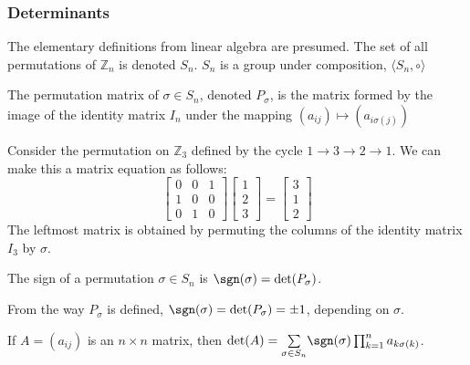 \documentclass[crop=false,class=article,oneside]{standalone}
\begin{document}
        \subsubsection{Determinants}
            The elementary definitions from linear algebra
            are presumed. The set of all permutations of
            $\mathbb{Z}_{n}$ is denoted $S_n$. $S_{n}$ is a
            group under composition,
            $\langle S_{n},\circ\rangle$
            \begin{definition}
                The permutation matrix of $\sigma \in S_{n}$,
                denoted $P_{\sigma}$, is the matrix formed
                by the image of the identity matrix $I_{n}$
                under the mapping
                $(a_{ij})\mapsto (a_{i\sigma(j)})$
            \end{definition}
            \begin{example}
                Consider the permutation on $\mathbb{Z}_3$
                defined by the cycle
                $1\rightarrow 3\rightarrow 2\rightarrow 1$.
                We can make this a matrix equation as follows:
                \begin{equation*}
                    \begin{bmatrix}
                        0&0&1\\
                        1&0&0\\
                        0&1&0
                    \end{bmatrix}
                    \begin{bmatrix}
                        1\\
                        2\\
                        3
                    \end{bmatrix}
                    =
                    \begin{bmatrix}
                        3\\
                        1\\
                        2
                    \end{bmatrix}    
                \end{equation*}
                The leftmost matrix is obtained by
                permuting the columns of the identity
                matrix $I_{3}$ by $\sigma$.
            \end{example}
            \begin{definition}
                The sign of a permutation $\sigma\in S_{n}$
                is $\sgn(\sigma) = \det(P_{\sigma})$.
            \end{definition}
            \begin{remark}
                From the way $P_{\sigma}$ is defined,
                $\sgn(\sigma)=\det(P_{\sigma})=\pm 1$,
                depending on $\sigma$.
            \end{remark}
            \begin{theorem}
                If $A=(a_{ij})$ is an $n\times n$ matrix, then
                $\det(A)=\underset{\sigma\in S_n}%
                 \sum\sgn(\sigma)\prod_{k=1}^{n}a_{k\sigma(k)}$.
            \end{theorem}
\end{document}
